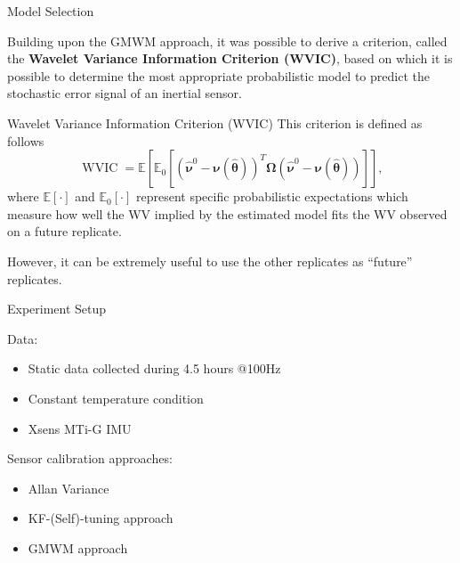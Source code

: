 \documentclass[envcountsect,usenames,dvipsnames]{beamer}
\DeclareMathOperator*{\WVIC}{WVIC}
\theoremstyle{mystyle}
\begin{document}
\begin{frame}{Model Selection}


Building upon the GMWM approach, it was possible to derive a criterion, called the {\color{beamer@myorange}\textbf{Wavelet Variance Information Criterion (WVIC)}}, based on which it is possible to determine the most appropriate probabilistic model to predict the stochastic error signal of an inertial sensor.

\begin{block}{Wavelet Variance Information Criterion (WVIC)}
    This criterion is defined as follows
%
\begin{equation}
		\WVIC = \mathbb{E} \left[ \mathbb{E}_0 \left[  \left(\hat{\bm{\nu}}^0 - \bm{\nu}(\hat{\bm{\theta}})\right)^{T} {\bm{\Omega}} \left(\hat{\bm{\nu}}^0 - \bm{\nu}(\hat{\bm{\theta}})\right)
		\right] \right] ,
		\label{eq:WVIC}
\end{equation}
%
where $\mathbb{E}[\cdot]$ and $\mathbb{E}_0[\cdot]$ represent specific probabilistic expectations  which measure how well the WV implied by the estimated model fits the WV observed on a future replicate.  
\end{block}

However, it can be extremely useful to use the other replicates as ``future'' replicates.
    
\end{frame}



\begin{frame}{Experiment Setup}

	\begin{exampleblock}{Data:}
		\begin{itemize}
			\item Static data collected during 4.5 hours @100Hz
			\item Constant temperature condition
			\item Xsens MTi-G IMU
		\end{itemize}
	\end{exampleblock}

	\begin{block}{Sensor calibration approaches:}
		\begin{itemize}
			\item Allan Variance
			\item KF-(Self)-tuning approach
			\item GMWM approach
		\end{itemize}
	\end{block}
\end{frame}
\end{document}
